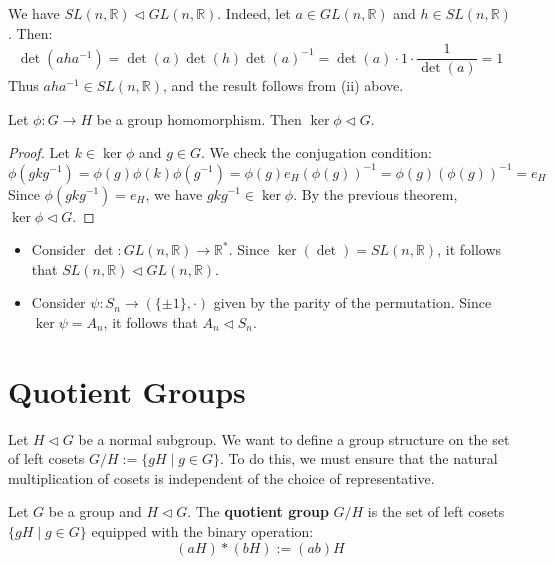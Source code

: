 \begin{example}
    We have $SL(n, \mathbb{R}) \triangleleft GL(n, \mathbb{R})$. Indeed, let $a \in GL(n, \mathbb{R})$ and $h \in SL(n, \mathbb{R})$. Then:
    \[ \det(a h a^{-1}) = \det(a) \det(h) \det(a)^{-1} = \det(a) \cdot 1 \cdot \frac{1}{\det(a)} = 1 \]
    Thus $a h a^{-1} \in SL(n, \mathbb{R})$, and the result follows from (ii) above.
\end{example}


\begin{corollary}
Let $\phi : G \to H$ be a group homomorphism. Then $\ker \phi \triangleleft G$.
\end{corollary}

\begin{proof}
Let $k \in \ker \phi$ and $g \in G$. We check the conjugation condition:
\[ \phi(g k g^{-1}) = \phi(g) \phi(k) \phi(g^{-1}) = \phi(g) e_H (\phi(g))^{-1} = \phi(g) (\phi(g))^{-1} = e_H \]
Since $\phi(g k g^{-1}) = e_H$, we have $g k g^{-1} \in \ker \phi$. By the previous theorem, $\ker \phi \triangleleft G$.
\end{proof}

\begin{example}
\begin{itemize}
    \item Consider $\det : GL(n, \mathbb{R}) \to \mathbb{R}^*$. Since $\ker(\det) = SL(n, \mathbb{R})$, it follows that $SL(n, \mathbb{R}) \triangleleft GL(n, \mathbb{R})$.
    \item Consider $\psi : S_n \to (\{ \pm 1 \}, \cdot)$ given by the parity of the permutation. Since $\ker \psi = A_n$, it follows that $A_n \triangleleft S_n$.
\end{itemize}
\end{example}

\section{Quotient Groups}
Let $H \triangleleft G$ be a normal subgroup. We want to define a group structure on the set of left cosets $G/H := \{ gH \mid g \in G \}$. To do this, we must ensure that the natural multiplication of cosets is independent of the choice of representative.

\begin{definition}
Let $G$ be a group and $H \triangleleft G$. The \textbf{quotient group} $G/H$ is the set of left cosets $\{ gH \mid g \in G \}$ equipped with the binary operation:
\[ (aH) * (bH) := (ab)H \]
\end{definition}

